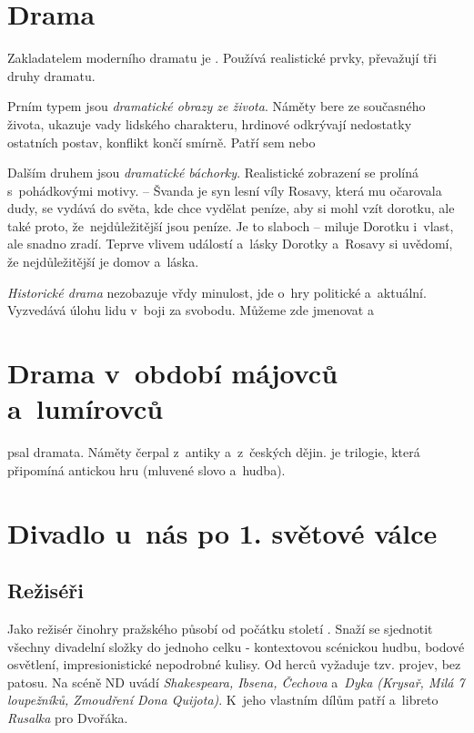 \section{Drama}
Zakladatelem moderního dramatu je . Používá
realistické prvky, převažují tři druhy dramatu.

Prním typem jsou \emph{dramatické obrazy ze života}. Náměty bere ze
současného života, ukazuje vady lidského charakteru, hrdinové odkrývají
nedostatky ostatních postav, konflikt končí smírně.
Patří sem   nebo 

Dalším druhem jsou \emph{dramatické báchorky}. Realistické zobrazení se
prolíná s~pohádkovými motivy.  -- Švanda je syn
lesní víly Rosavy, která mu očarovala dudy, se vydává do světa, kde chce
vydělat peníze, aby si mohl vzít dorotku, ale také proto,
že~nejdůležitější jsou peníze. Je to slaboch -- miluje Dorotku i~vlast,
ale snadno zradí. Teprve vlivem událostí a~lásky Dorotky a~Rosavy si
uvědomí, že nejdůležitější je domov a~láska.

\emph{Historické drama} nezobazuje vřdy minulost, jde o~hry politické 
a~aktuální. Vyzvedává úlohu lidu v~boji za svobodu.
Můžeme zde jmenovat    
a~

\section{Drama v~období májovců a~lumírovců}
 psal dramata. Náměty čerpal z~antiky a~z~českých
dějin.  je trilogie, která připomíná antickou hru
(mluvené slovo a~hudba).

\section{Divadlo u~nás po 1. světové válce}
\subsection*{Režiséři}
Jako režisér činohry pražského  působí od počátku století .
Snaží se sjednotit všechny divadelní složky do jednoho celku -
kontextovou scénickou hudbu, bodové osvětlení, impresionistické
nepodrobné kulisy. Od herců vyžaduje tzv.  projev, bez patosu. Na
scéně ND uvádí \emph{Shakespeara, Ibsena, Čechova} a~\emph{Dyka (Krysař, Milá 7
loupežníků, Zmoudření Dona Quijota)}. K~jeho vlastním dílům patří
 a~libreto \emph{Rusalka} pro Dvořáka.

